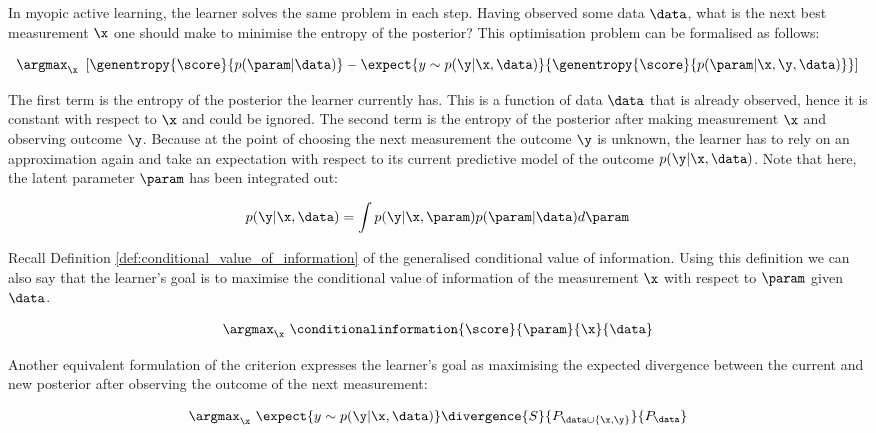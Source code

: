 In myopic active learning, the learner solves the same problem in each step. Having observed some data $\data$, what is the next best measurement $\x$ one should make to minimise the entropy of the posterior? This optimisation problem can be formalised as follows:

\begin{equation}
	\argmax_\x\ \left[ \genentropy{\score}{p(\param\vert\data)} - \expect{y\sim p(\y\vert \x, \data)}{\genentropy{\score}{p(\param\vert \x,\y,\data)} }\right ]
	\label{eqn:active_learning_optimisation_criterion}
\end{equation}

The first term is the entropy of the posterior the learner currently has. This is a function of data $\data$ that is already observed, hence it is constant with respect to $\x$ and could be ignored. The second term is the entropy of the posterior after making measurement $\x$ and observing outcome $\y$. Because at the point of choosing the next measurement the outcome $\y$ is unknown, the learner has to rely on an approximation again and take an expectation with respect to its current predictive model of the outcome $p(\y \vert \x, \data)$. Note that here, the latent parameter $\param$ has been integrated out:

\begin{equation}
	p(\y \vert \x, \data) = \int p(\y \vert \x, \param) p(\param \vert \data) d\param
\end{equation}

Recall Definition \ref{def:conditional_value_of_information} of the generalised conditional value of information. Using this definition we can also say that the learner's goal is to maximise the conditional value of information of the measurement $\x$ with respect to $\param$ given $\data$.

\begin{equation}
	\argmax_\x\ \conditionalinformation{\score}{\param}{\x}{\data}
\end{equation}

Another equivalent formulation of the criterion expresses the learner's goal as maximising the expected divergence between the current and new posterior after observing the outcome of the next measurement:

\begin{equation}
	\argmax_\x\  \expect{y \sim p(\y\vert \x, \data)}\divergence{S}{P_{\data\cup\{\x,\y\}}}{P_{\data}}
\end{equation}

